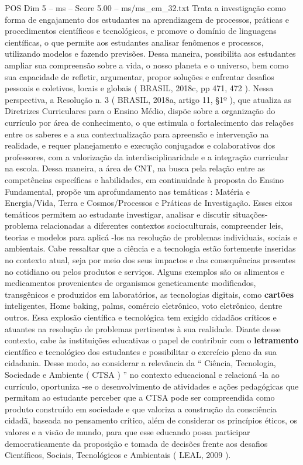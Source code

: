 \begin{textsample}{POS Dim 5 – ms – Score 5.00 – ms/ms\_em\_32.txt}
Trata a investigação como forma de engajamento dos estudantes na aprendizagem de processos, práticas e procedimentos científicos e tecnológicos, e promove o domínio de linguagens científicas, o que permite aos estudantes analisar fenômenos e processos, utilizando modelos e fazendo previsões.
Dessa maneira, possibilita aos estudantes ampliar sua compreensão sobre a vida, o nosso planeta e o universo, bem como sua capacidade de refletir, argumentar, propor soluções e enfrentar desafios pessoais e coletivos, locais e globais ( BRASIL, 2018c, pp 471, 472 ).
Nessa perspectiva, a Resolução n. 3 ( BRASIL, 2018a, artigo 11, §1º ), que atualiza as Diretrizes Curriculares para o Ensino Médio, dispõe sobre a organização do currículo por área de conhecimento, o que estimula o fortalecimento das relações entre os saberes e a sua contextualização para apreensão e intervenção na realidade, e requer planejamento e execução conjugados e colaborativos dos professores, com a valorização da interdisciplinaridade e a integração curricular na escola.
Dessa maneira, a área de CNT, na busca pela relação entre as competências específicas e habilidades, em continuidade à proposta do Ensino Fundamental, propõe um aprofundamento nas temáticas : Matéria e Energia/Vida, Terra e Cosmos/Processos e Práticas de Investigação.
Esses eixos temáticos permitem ao estudante investigar, analisar e discutir situações-problema relacionadas a diferentes contextos socioculturais, compreender leis, teorias e modelos para aplicá -los na resolução de problemas individuais, sociais e ambientais.
Cabe ressaltar que a ciência e a tecnologia estão fortemente inseridas no contexto atual, seja por meio dos seus impactos e das consequências presentes no cotidiano ou pelos produtos e serviços.
Alguns exemplos são os alimentos e medicamentos provenientes de organismos geneticamente modificados, transgênicos e produzidos em laboratórios, as tecnologias digitais, como \textbf{cartões} inteligentes, Home baking, palms, comércio eletrônico, voto eletrônico, dentre outros.
Essa explosão científica e tecnológica tem exigido cidadãos críticos e atuantes na resolução de problemas pertinentes à sua realidade.
Diante desse contexto, cabe às instituições educativas o papel de contribuir com o \textbf{letramento} científico e tecnológico dos estudantes e possibilitar o exercício pleno da sua cidadania.
Desse modo, ao considerar a relevância da “ Ciência, Tecnologia, Sociedade e Ambiente ( CTSA ) ” no contexto educacional e relacioná -la ao currículo, oportuniza -se o desenvolvimento de atividades e ações pedagógicas que permitam ao estudante perceber que a CTSA pode ser compreendida como produto construído em sociedade e que valoriza a construção da consciência cidadã, baseada no pensamento crítico, além de considerar os princípios éticos, os valores e a visão de mundo, para que esse educando possa participar democraticamente da proposição e tomada de decisões frente aos desafios Científicos, Sociais, Tecnológicos e Ambientais ( LEAL, 2009 ).

\end{textsample}
